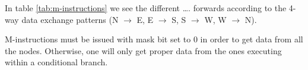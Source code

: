 

In table \ref{tab:m-instructions} we see the different  \ldots.  forwards according to the 4-way data
exchange patterns (N $\rightarrow$ E, E $\rightarrow$ S, S $\rightarrow$ W, W
$\rightarrow$ N).

M-instructions must be issued with mask bit set to 0 in order to get data from
all the nodes. Otherwise, one will only get proper data from the ones executing
within a conditional branch. 
